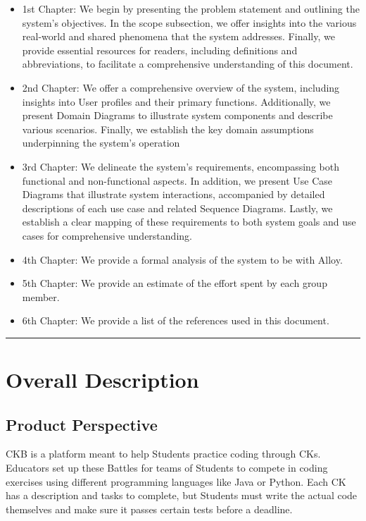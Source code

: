 \documentclass{Configuration_Files/Template}
\begin{document}
\begin{itemize}
\item \textcolor{bluepoli}{1st Chapter:} We begin by presenting the problem statement and outlining the system's objectives. In the scope subsection, we offer insights into the various real-world and shared phenomena that the system addresses. Finally, we provide essential resources for readers, including definitions and abbreviations, to facilitate a comprehensive understanding of this document.
\item \textcolor{bluepoli}{2nd Chapter:} We offer a comprehensive overview of the system, including insights into User profiles and their primary functions. Additionally, we present Domain Diagrams to illustrate system components and describe various scenarios. Finally, we establish the key domain assumptions underpinning the system's operation
\item \textcolor{bluepoli}{3rd Chapter:} We delineate the system's requirements, encompassing both functional and non-functional aspects. In addition, we present Use Case Diagrams that illustrate system interactions, accompanied by detailed descriptions of each use case and related Sequence Diagrams. Lastly, we establish a clear mapping of these requirements to both system goals and use cases for comprehensive understanding.
\item \textcolor{bluepoli}{4th Chapter:} We provide a formal analysis of the system to be with Alloy.
\item \textcolor{bluepoli}{5th Chapter:} We provide an estimate of the effort spent by each group member.
\item \textcolor{bluepoli}{6th Chapter:} We provide a list of the references used in this document.
\end{itemize}

{\color{bluepoli}\rule{\linewidth}{0.1pt}}

\chapter{Overall Description}

\section{Product Perspective}

CKB is a platform meant to help Students practice coding through CKs. Educators set up these Battles for teams of Students to compete in coding exercises using different programming languages like Java or Python. Each CK has a description and tasks to complete, but Students must write the actual code themselves and make sure it passes certain tests before a deadline.
\end{document}
